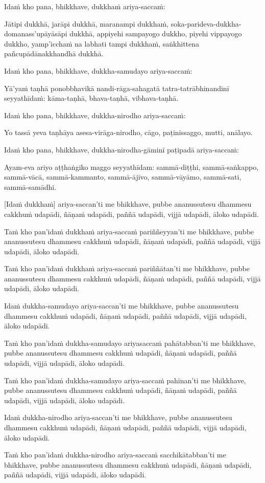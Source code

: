 Idaṁ kho pana, bhikkhave, dukkhaṁ ariya-saccaṁ:

Jātipi dukkhā, jarāpi dukkhā, maranampi dukkhaṁ,
soka-parideva-dukkha-domanass'upāyāsāpi dukkhā, appiyehi sampayogo
dukkho, piyehi vippayogo dukkho, yamp'icchaṁ na labhati tampi dukkhaṁ,
saṅkhittena pañcupādānakkhandhā dukkhā.

Idaṁ kho pana, bhikkhave, dukkha-samudayo ariya-saccaṁ:

Yā'yaṁ taṇhā ponobbhavikā nandi-rāga-sahagatā tatra-tatrābhinandinī
seyyathīdaṁ: kāma-taṇhā, bhava-taṇhā, vibhava-taṇhā.

Idaṁ kho pana, bhikkhave, dukkha-nirodho ariya-saccaṁ:

Yo tassā yeva taṇhāya asesa-virāga-nirodho, cāgo, paṭinissaggo, mutti,
anālayo.

Idaṁ kho pana, bhikkhave, dukkha-nirodha-gāminī paṭipadā ariya-saccaṁ:

Ayam-eva ariyo aṭṭhaṅgiko maggo seyyathīdam: sammā-diṭṭhi,
sammā-saṅkappo, sammā-vācā, sammā-kammanto, sammā-ājīvo, sammā-vāyāmo,
sammā-sati, sammā-samādhi.

[Idaṁ dukkhaṁ] ariya-saccan'ti me bhikkhave, pubbe ananussutesu dhammesu
cakkhuṁ udapādi, ñāṇaṁ udapādi, paññā udapādi, vijjā udapādi, āloko
udapādi.

Taṁ kho pan'idaṁ dukkhaṁ ariya-saccaṁ pariññeyyan'ti me bhikkhave, pubbe
ananussutesu dhammesu cakkhuṁ udapādi, ñāṇaṁ udapādi, paññā udapādi,
vijjā udapādi, āloko udapādi.

Taṁ kho pan'idaṁ dukkhaṁ ariya-saccaṁ pariññātan'ti me bhikkhave, pubbe
ananussutesu dhammesu cakkhuṁ udapādi, ñāṇaṁ udapādi, paññā udapādi,
vijjā udapādi, āloko udapādi.

Idaṁ dukkha-samudayo ariya-saccan'ti me bhikkhave, pubbe ananussutesu
dhammesu cakkhuṁ udapādi, ñāṇaṁ udapādi, paññā udapādi, vijjā udapādi,
āloko udapādi.

Taṁ kho pan'idaṁ dukkha-samudayo ariyasaccaṁ pahātabban'ti me bhikkhave,
pubbe ananussutesu dhammesu cakkhuṁ udapādi, ñāṇaṁ udapādi, paññā
udapādi, vijjā udapādi, āloko udapādi.

Taṁ kho pan'idaṁ dukkha-samudayo ariya-saccaṁ pahīnan'ti me bhikkhave, pubbe
ananussutesu dhammesu cakkhuṁ udapādi, ñāṇaṁ udapādi, paññā udapādi,
vijjā udapādi, āloko udapādi.

Idaṁ dukkha-nirodho ariya-saccan'ti me bhikkhave, pubbe ananussutesu
dhammesu cakkhuṁ udapādi, ñāṇaṁ udapādi, paññā udapādi, vijjā udapādi,
āloko udapādi.

Taṁ kho pan'idaṁ dukkha-nirodho ariya-saccaṁ sacchikātabban'ti me bhikkhave,
pubbe ananussutesu dhammesu cakkhuṁ udapādi, ñāṇaṁ udapādi, paññā
udapādi, vijjā udapādi, āloko udapādi.

